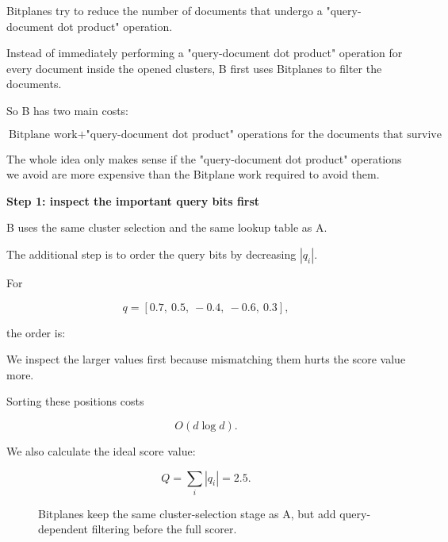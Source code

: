 Bitplanes try to reduce the number of documents that undergo a "query-document dot product" operation.

Instead of immediately performing a "query-document dot product" operation for every document inside the opened clusters, B first uses Bitplanes to filter the documents.

So B has two main costs:

\[
\boxed{
\text{Bitplane work}
+
\text{"query-document dot product" operations for the documents that survive}
}
\]

The whole idea only makes sense if the "query-document dot product" operations we avoid are more expensive than the Bitplane work required to avoid them.



\textbf{Step 1: inspect the important query bits first}\par

B uses the same cluster selection and the same lookup table as A.

The additional step is to order the query bits by decreasing \(|q_i|\).

For

\[
q=[0.7,\ 0.5,\ -0.4,\ -0.6,\ 0.3],
\]

the order is:

\begin{center}\end{center}

We inspect the larger values first because mismatching them hurts the score value more.

Sorting these positions costs

\[
O(d\log d).
\]

We also calculate the ideal score value:

\[
Q=\sum_i|q_i|=2.5.
\]


\begin{figure}[htbp]
\centering
{}
\caption{Bitplanes keep the same cluster-selection stage as A, but add query-dependent filtering before the full scorer.}
\end{figure}





